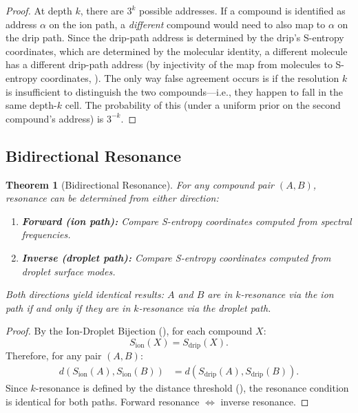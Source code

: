 \documentclass[11pt,twocolumn,a4paper]{article}
\newtheorem{theorem}{Theorem}[section]
\theoremstyle{definition}
\theoremstyle{remark}
\begin{document}
\begin{proof}
At depth $k$, there are $3^k$ possible addresses. If a compound is identified as address $\alpha$ on the ion path, a \emph{different} compound would need to also map to $\alpha$ on the drip path. Since the drip-path address is determined by the drip's S-entropy coordinates, which are determined by the molecular identity, a different molecule has a different drip-path address (by injectivity of the map from molecules to S-entropy coordinates, ). The only way false agreement occurs is if the resolution $k$ is insufficient to distinguish the two compounds---i.e., they happen to fall in the same depth-$k$ cell. The probability of this (under a uniform prior on the second compound's address) is $3^{-k}$.
\end{proof}

\subsection{Bidirectional Resonance}\label{sec:bidirectional}

\begin{theorem}[Bidirectional Resonance]\label{thm:bidirectional}
For any compound pair $(A, B)$, resonance can be determined from either direction:
\begin{enumerate}[label=(\alph*)]
  \item \textbf{Forward (ion path):} Compare S-entropy coordinates computed from spectral frequencies.
  \item \textbf{Inverse (droplet path):} Compare S-entropy coordinates computed from droplet surface modes.
\end{enumerate}
Both directions yield identical results: $A$ and $B$ are in $k$-resonance via the ion path if and only if they are in $k$-resonance via the droplet path.
\end{theorem}

\begin{proof}
By the Ion-Droplet Bijection (), for each compound $X$:
\[
  S_{\mathrm{ion}}(X) = S_{\mathrm{drip}}(X).
\]
Therefore, for any pair $(A, B)$:
\begin{align}
  d(S_{\mathrm{ion}}(A), S_{\mathrm{ion}}(B)) &= d(S_{\mathrm{drip}}(A), S_{\mathrm{drip}}(B)).
\end{align}
Since $k$-resonance is defined by the distance threshold (), the resonance condition is identical for both paths. Forward resonance $\Leftrightarrow$ inverse resonance.
\end{proof}
\end{document}
